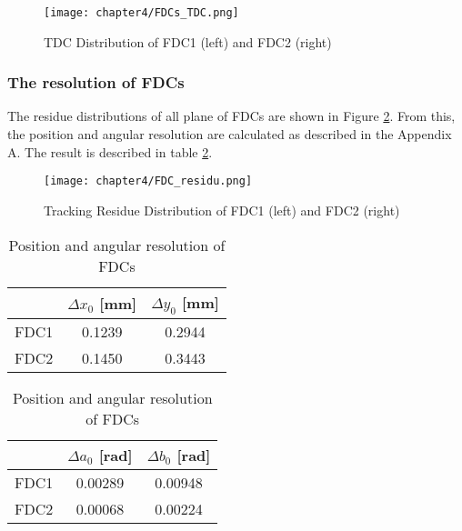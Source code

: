 \begin{figure}
    \centering
    \texttt{[image: chapter4/FDCs\_TDC.png]}
    \caption[TDC Distribution of FDCs]{TDC Distribution of FDC1 (left) and FDC2 (right)}
    \label{fig:TDC_FDCs}
\end{figure}

\subsubsection{The resolution of FDCs}
The residue distributions of all plane of FDCs are shown in Figure \ref{fig:residue_fdcs}. From this, the position and angular resolution are calculated as described in the Appendix A. The result is described in table \ref{tab:resolution_fdcs}.

 \begin{figure}
    \centering
    \texttt{[image: chapter4/FDC\_residu.png]}
    \caption[Tracking Residue Distribution of FDCs]{Tracking Residue Distribution of FDC1 (left) and FDC2 (right)}
    \label{fig:residue_fdcs}
\end{figure}

\begin{table}[h]
    \centering
    \begin{tabular}{c|cc}
        \hline
                &  $\Delta x_0$ [mm] & $\Delta y_0$ [mm]\\
            \hline
            FDC1 & 0.1239 & 0.2944 \\
            FDC2 &  0.1450 & 0.3443\\
            \hline
    \end{tabular}

    \begin{tabular}{c|cc}
    \hline
        & $\Delta a_0$ [rad] & $\Delta b_0$ [rad]\\
        \hline
        FDC1 & 0.00289 & 0.00948\\
        FDC2 & 0.00068 & 0.00224 \\
        \hline
    \end{tabular}
    \caption{Position and angular resolution of FDCs}
    \label{tab:resolution_fdcs}
\end{table}

